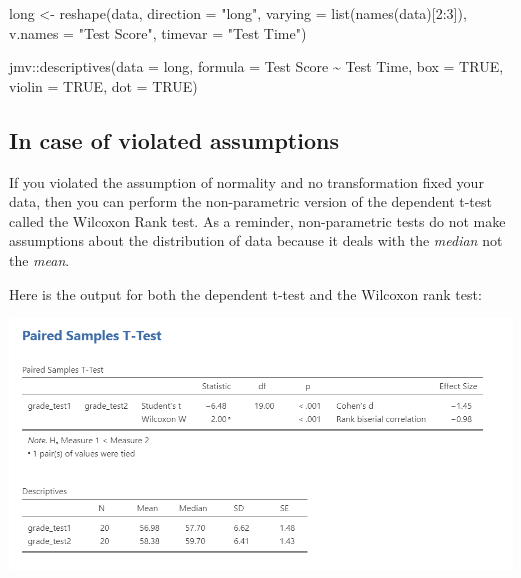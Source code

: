 \documentclass[
]{book}
\newenvironment{Shaded}{\begin{snugshade}}{\end{snugshade}}
\newcommand{\AttributeTok}[1]{\textcolor[rgb]{0.77,0.63,0.00}{#1}}
\newcommand{\ConstantTok}[1]{\textcolor[rgb]{0.00,0.00,0.00}{#1}}
\newcommand{\DecValTok}[1]{\textcolor[rgb]{0.00,0.00,0.81}{#1}}
\newcommand{\FunctionTok}[1]{\textcolor[rgb]{0.00,0.00,0.00}{#1}}
\newcommand{\NormalTok}[1]{#1}
\newcommand{\OtherTok}[1]{\textcolor[rgb]{0.56,0.35,0.01}{#1}}
\newcommand{\SpecialCharTok}[1]{\textcolor[rgb]{0.00,0.00,0.00}{#1}}
\newcommand{\StringTok}[1]{\textcolor[rgb]{0.31,0.60,0.02}{#1}}
\begin{document}
\begin{Shaded}
\begin{Highlighting}[]
\NormalTok{long }\OtherTok{\textless{}{-}} \FunctionTok{reshape}\NormalTok{(data, }
                \AttributeTok{direction =} \StringTok{"long"}\NormalTok{, }
                \AttributeTok{varying =} \FunctionTok{list}\NormalTok{(}\FunctionTok{names}\NormalTok{(data)[}\DecValTok{2}\SpecialCharTok{:}\DecValTok{3}\NormalTok{]),}
                \AttributeTok{v.names =} \StringTok{"Test Score"}\NormalTok{,}
                \AttributeTok{timevar =} \StringTok{"Test Time"}\NormalTok{)}


\NormalTok{jmv}\SpecialCharTok{::}\FunctionTok{descriptives}\NormalTok{(}\AttributeTok{data =}\NormalTok{ long,}
                  \AttributeTok{formula =} \StringTok{\textasciigrave{}}\AttributeTok{Test Score}\StringTok{\textasciigrave{}} \SpecialCharTok{\textasciitilde{}} \StringTok{\textasciigrave{}}\AttributeTok{Test Time}\StringTok{\textasciigrave{}}\NormalTok{,}
                  \AttributeTok{box =} \ConstantTok{TRUE}\NormalTok{,}
                  \AttributeTok{violin =} \ConstantTok{TRUE}\NormalTok{,}
                  \AttributeTok{dot =} \ConstantTok{TRUE}\NormalTok{)}
\end{Highlighting}
\end{Shaded}

\hypertarget{in-case-of-violated-assumptions-2}{%
\subsection{In case of violated assumptions}\label{in-case-of-violated-assumptions-2}}

If you violated the assumption of normality and no transformation fixed your data, then you can perform the non-parametric version of the dependent t-test called the Wilcoxon Rank test. As a reminder, non-parametric tests do not make assumptions about the distribution of data because it deals with the \emph{median} not the \emph{mean}.

Here is the output for both the dependent t-test and the Wilcoxon rank test:

\includegraphics{images/03_dependent_t-test/dependent_results_full.png}
\end{document}
